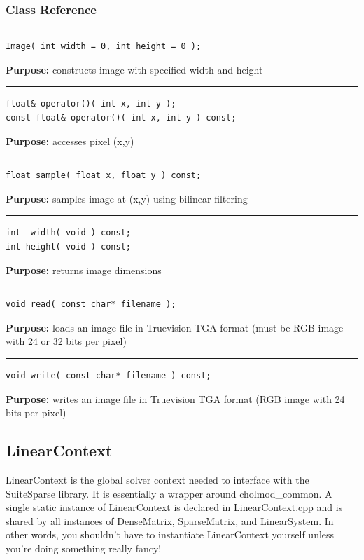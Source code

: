 \documentclass{article}
\begin{document}
\subsubsection{Class Reference}

\rule{5in}{1pt}
\begin{verbatim}
Image( int width = 0, int height = 0 );
\end{verbatim}
\textbf{Purpose:}
constructs image with specified width and height

\hspace{-.21in}\rule{5in}{1pt}
\begin{verbatim}
float& operator()( int x, int y );
const float& operator()( int x, int y ) const;
\end{verbatim}
\textbf{Purpose:}
accesses pixel (x,y)

\hspace{-.21in}\rule{5in}{1pt}
\begin{verbatim}
float sample( float x, float y ) const;
\end{verbatim}
\textbf{Purpose:}
samples image at (x,y) using bilinear filtering

\hspace{-.21in}\rule{5in}{1pt}
\begin{verbatim}
int  width( void ) const;
int height( void ) const;
\end{verbatim}
\textbf{Purpose:}
returns image dimensions

\hspace{-.21in}\rule{5in}{1pt}
\begin{verbatim}
void read( const char* filename );
\end{verbatim}
\textbf{Purpose:}
loads an image file in Truevision TGA format
(must be RGB image with 24 or 32 bits per pixel)

\hspace{-.21in}\rule{5in}{1pt}
\begin{verbatim}
void write( const char* filename ) const;
\end{verbatim}
\textbf{Purpose:}
writes an image file in Truevision TGA format
(RGB image with 24 bits per pixel)
\pagebreak\subsection{LinearContext}

 

 LinearContext is the global solver context needed to interface with the SuiteSparse library.  It is essentially a wrapper around cholmod\_common.  A single static instance of LinearContext is declared in LinearContext.cpp and is shared by all instances of DenseMatrix, SparseMatrix, and LinearSystem. In other words, you shouldn't have to instantiate LinearContext yourself unless you're doing something really fancy! 
\end{document}
